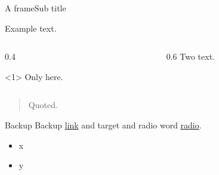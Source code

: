 \begin{frame}[label={sec:orgccaa7db},shrink=10]{A frame}{Sub \alert{title}}
\begin{example}[Example]\label{sec:org63a3f21}
Example text.
\end{example}
\begin{columns}[T]
\begin{column}{0.4\columnwidth}
\begin{onlyenv}<1>
Only here.
\end{onlyenv}
\end{column}
\begin{column}{0.6\columnwidth}
Two text.
\end{column}
\end{columns}
\begin{quote} %
Quoted.
\end{quote}
\end{frame}
\appendix
\begin{block}{Backup}
Backup \hyperlink{sec:orgccaa7db}{link} and \label{orgf7584ab} target and \hypertarget{org80d4c9c}{radio} word \hyperlink{org80d4c9c}{radio}.

\begin{itemize}[<+->]
\item x
\item y
\end{itemize}
\end{block}
